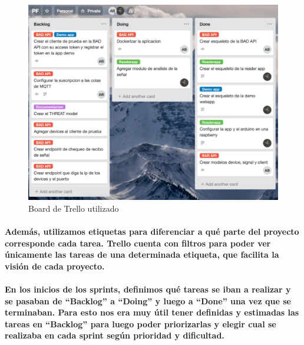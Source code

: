 \documentclass{article}
\begin{document}
\begin{figure}[ht]
    \centering
    \includegraphics[width=\textwidth]{trelloboard.png}%
    \caption{Board de Trello utilizado}
    \label{fig:trelloboard}
\end{figure}

\paragraph{
Además, utilizamos etiquetas para diferenciar a qué parte del proyecto corresponde cada tarea. Trello cuenta con filtros para poder ver únicamente las tareas de una determinada etiqueta, que facilita la visión de cada proyecto.
}
\paragraph{
En los inicios de los sprints, definimos qué tareas se iban a realizar y se pasaban de “Backlog” a “Doing” y luego a “Done” una vez que se terminaban. Para esto nos era muy útil tener definidas y estimadas las tareas en “Backlog” para luego poder priorizarlas y elegir cual se realizaba en cada sprint según prioridad y dificultad.
}
\end{document}
